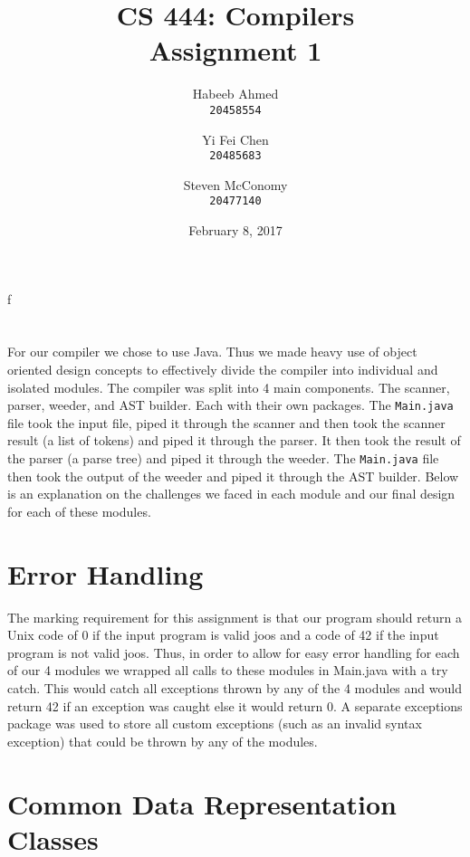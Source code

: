 f\documentclass[12pt]{article}
\title{CS 444: Compilers\\Assignment 1}
\author{Habeeb Ahmed \\ \texttt{20458554} \and Yi Fei Chen \\ \texttt{20485683} \and Steven McConomy \\ \texttt{20477140}}
\date{February 8, 2017}
\begin{document}
\maketitle

\section*{}

For our compiler we chose to use Java. Thus we made heavy use of object oriented design concepts to
effectively divide the compiler into individual and isolated modules. The compiler was split into 4
main components. The scanner, parser, weeder, and AST builder. Each with their own packages. The
\texttt{Main.java} file took the input file, piped it through the scanner and then took the scanner
result (a list of tokens) and piped it through the parser. It then took the result of the parser (a
parse tree) and piped it through the weeder. The \texttt{Main.java} file then took the output of the
weeder and piped it through the AST builder. Below is an explanation on the challenges we faced in
each module and our final design for each of these modules.

\section*{Error Handling}

The marking requirement for this assignment is that our program should return a Unix code of 0 if
the input program is valid joos and a code of 42 if the input program is not valid joos. Thus, in
order to allow for easy error handling for each of our 4 modules we wrapped all calls to these
modules in Main.java with a try catch. This would catch all exceptions thrown by any of the 4
modules and would return 42 if an exception was caught else it would return 0. A separate exceptions
package was used to store all custom exceptions (such as an invalid syntax exception) that could be
thrown by any of the modules.

\section*{Common Data Representation Classes}
\end{document}
